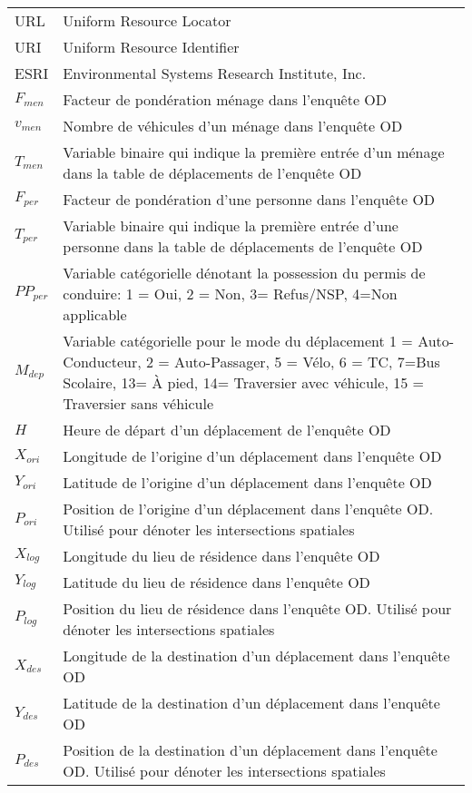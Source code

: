 \begin{longtable}{lp{5in}}
URL     & Uniform Resource Locator                                                      \\
URI     & Uniform Resource Identifier                                                   \\
ESRI    & Environmental Systems Research Institute, Inc. \\
$F_{men}$ & Facteur de pondération ménage dans l'enquête OD                             \\
$v_{men}$ & Nombre de véhicules d'un ménage dans l'enquête OD                           \\
$T_{men}$ & Variable binaire qui indique la première entrée d'un ménage dans la table de déplacements de l'enquête OD \\
$F_{per}$ & Facteur de pondération d'une personne dans l'enquête OD                     \\
$T_{per}$ & Variable binaire qui indique la première entrée d'une personne dans la table de déplacements de l'enquête OD\\
$PP_{per}$ & Variable catégorielle dénotant la possession du permis de conduire: 1 = Oui, 2 = Non, 3= Refus/NSP, 4=Non applicable\\
$M_{dep}$ & Variable catégorielle pour le mode du déplacement 1 = Auto-Conducteur, 2 = Auto-Passager, 5 = Vélo, 6 = TC, 7=Bus Scolaire, 13= À pied, 14= Traversier avec véhicule, 15 = Traversier sans véhicule\\
$H$ & Heure de départ d'un déplacement de l'enquête OD \\ 
$X_{ori}$ & Longitude de l'origine d'un déplacement dans l'enquête OD \\
$Y_{ori}$ & Latitude de l'origine d'un déplacement dans l'enquête OD\\
$P_{ori}$ & Position de l'origine d'un déplacement dans l'enquête OD. Utilisé pour dénoter les intersections spatiales \\ 
$X_{log}$ & Longitude du lieu de résidence dans l'enquête OD\\
$Y_{log}$ & Latitude du lieu de résidence dans l'enquête OD\\
$P_{log}$ & Position du lieu de résidence dans l'enquête OD. Utilisé pour dénoter les intersections spatiales \\
$X_{des}$ & Longitude de la destination d'un déplacement dans l'enquête OD\\
$Y_{des}$ & Latitude de la destination d'un déplacement dans l'enquête OD\\
$P_{des}$ & Position de la destination d'un déplacement dans l'enquête OD. Utilisé pour dénoter les intersections spatiales \\

\end{longtable}
